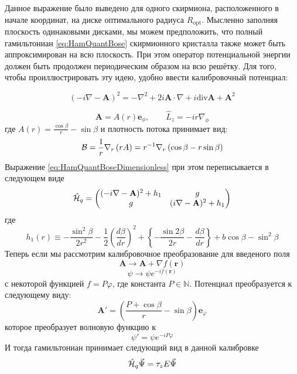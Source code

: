 \documentclass[a4paper,article,14pt]{extarticle}
\begin{document}
Данное выражение было выведено для одного скирмиона, расположенного в начале координат, на диске оптимального радиуса $R_\text{opt}$. Мысленно заполняя плоскость одинаковыми дисками, мы можем предположить, что полный гамильтониан \ref{eq:HamQuantBose} скирмионного кристалла также может быть аппроксимирован на всю плоскость. При этом оператор потенциальной энергии должен быть продолжен периодическим образом на всю решётку. Для того, чтобы проиллюстрировать эту идею, удобно ввести калибровочный потенциал:


\begin{equation}
(- i \nabla - \mathbf{A} ) ^ 2 = - \nabla ^ 2 + 2 i \mathbf{A} \cdot \nabla + i \text{div} \mathbf{A}  + \mathbf{A}^2
\end{equation}

$$
\mathbf{A} = A(r) \mathbf{e}_\phi ,  \qquad  \hat{L}_{z} = - i r \nabla_\phi
$$
где $A(r) = \frac{ \cos\beta } { r } - \sin \beta$ и плотность потока принимает вид:
$$
{\cal B}  = \frac 1 r \nabla_r \left(r A \right) = 
r^{-1}  \nabla_r \left(\cos\beta   -  r  \sin \beta \right)  
$$
Выражение \eqref{eq:HamQuantBoseDimensionless} при этом переписывается в следующем виде
\begin{equation}
\hat {\cal H}_{q} =\begin{pmatrix} (- i \nabla - \mathbf{A} ) ^ 2 + h_1 & g \\ g & ( i \nabla - \mathbf{A} ) ^ 2 + h_1 \end{pmatrix}
\end{equation}
где
\begin{equation}
h_1(r) \equiv  -\frac{\sin^2 \beta }{2r^2} - \frac{1}{2}\left( \frac{d\beta }{dr} \right)^2 +  \left\{  - \frac{\sin 2\beta }{2r}  - \frac{d\beta }{dr} \right\} + b\cos \beta - \sin ^ 2 \beta
\end{equation}
Теперь если мы рассмотрим калибровочное преобразование для введеного поля 
$$
\mathbf{A} \rightarrow \mathbf{A} + \nabla f(\mathbf{r})
$$
$$
\psi \rightarrow \psi e ^ {- i f(\mathbf{r})}
$$
с некоторой функцией  $f = P \varphi$, где константа $P \in \mathbb{N}$. Потенциал преобразуется к следующему виду:
$$
\mathbf{A'}= \left(\frac {P + \cos{\beta}} {r} - \sin{\beta} \right) \mathbf{e}_\varphi
$$
которое преобразует волновую функцию к
$$
\psi' = \psi e^{-i P \varphi} 
$$
И тогда гамильтониан принимает следующий вид в данной калибровке
\begin{equation}
\label{eq:init_ham_landau}
\hat {\cal H}_{q} \vec{\Psi} = \tau_z E \vec{\Psi}
\end{equation}
\end{document}
